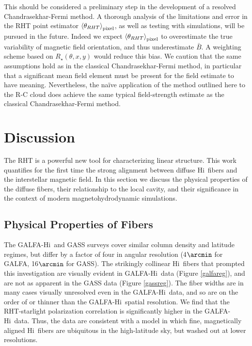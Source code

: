 \documentclass[12pt]{emulateapj}
\newcommand{\hi}{H{\sc i}~}
\begin{document}
This should be considered a preliminary step in the development of a resolved Chandrasekhar-Fermi method. A thorough analysis of the limitations and error in the RHT point estimator $\left<\theta_{RHT}\right>_{\rm pixel}$, as well as testing with simulations, will be pursued in the future. Indeed we expect $\left<\theta_{RHT}\right>_{\rm pixel}$ to overestimate the true variability of magnetic field orientation, and thus underestimate $\bar{B}$. A weighting scheme based on $R_\star\left(\theta, x, y\right)$ would reduce this bias. We caution that the same assumptions hold as in the classical Chandrasekhar-Fermi method, in particular that a significant mean field element must be present for the field estimate to have meaning. Nevertheless, the na\"ive application of the method outlined here to the R-C cloud does achieve the same typical field-strength estimate as the classical Chandrasekhar-Fermi method.

\section{Discussion}\label{discussion}
The RHT is a powerful new tool for characterizing linear structure. This work quantifies for the first time the strong alignment between diffuse \hi fibers and the interstellar magnetic field. In this section we discuss the physical properties of the diffuse fibers, their relationship to the local cavity, and their significance in the context of modern magnetohydrodynamic simulations.

\subsection{Physical Properties of Fibers}
The GALFA-\hi and GASS surveys cover similar column density and latitude regimes, but differ by a factor of four in angular resolution (4${\arcmin}$ for GALFA, 16${\arcmin}$ for GASS). The strikingly collinear \hi fibers that prompted this investigation are visually evident in GALFA-\hi data (Figure \ref{galfareg}), and are not as apparent in the GASS data (Figure \ref{gassreg}). The fiber widths are in many cases visually unresolved even in the GALFA-\hi data, and so are on the order of or thinner than the GALFA-\hi spatial resolution. We find that the RHT-starlight polarization correlation is significantly higher in the GALFA-\hi data. Thus, the data are consistent with a model in which fine, magnetically aligned \hi fibers are ubiquitous in the high-latitude sky, but washed out at lower resolutions. 
\end{document}
